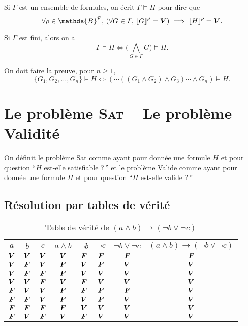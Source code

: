 \begin{defn}
	Si $\Gamma$\/ est un ensemble de formules, on écrit $\Gamma \models H$\/ pour dire que \[
		\forall \rho \in \mathds{B}^\mathcal{P},\,(\forall G \in \Gamma,\,\left\llbracket G \right\rrbracket^\rho = {\bfm V}\/) \implies \left\llbracket H \right\rrbracket^\rho = {\bfm V}\/
	.\]
\end{defn}

\begin{rmk}
	Si $\Gamma$\/ est fini, alors on a \[
		\Gamma \models H \iff \Big(\bigwedge_{G \in \Gamma} G\Big) \models H
	.\]

	On doit faire la preuve, pour $n \ge 1$, \[
		\{G_1, G_2, \ldots, G_n\} \models H \iff (\cdots((G_1 \land G_2) \land G_3) \cdots \land G_n) \models H
	.\]
\end{rmk}

\section{Le problème {\scshape Sat}\/ -- Le problème Validité}

On définit le problème {\sc Sat}\/ comme ayant pour donnée une formule $H$\/ et pour question ``$H$\/ est-elle satisfiable ?\,'' et le problème Valide comme ayant pour donnée une formule $H$\/ et pour question ``$H$\/ est-elle valide ?\,''

\subsection{Résolution par tables de vérité}

\begin{exm}
	\null

	\begin{table}[H]
		\centering
		\begin{tabular}{c|c|c|c|c|c|c|c}
			$a$\/ &$b$\/ &$c$\/ &$a\land b$\/ &$\lnot b$\/ &$\lnot c$\/ &$\lnot b \lor \lnot c$\/&$(a \land b) \to (\lnot b \lor \lnot c)$\\\hline
			$\bm{V}$&$\bm{V}$&$\bm{V}$&$\bm{V}$&$\bm{F}$&$\bm{F}$&$\bm{F}$&$\bm{F}$\\
			$\bm{V}$&$\bm{F}$&$\bm{V}$&$\bm{F}$&$\bm{V}$&$\bm{F}$&$\bm{V}$&$\bm{V}$\\
			$\bm{V}$&$\bm{F}$&$\bm{F}$&$\bm{F}$&$\bm{V}$&$\bm{V}$&$\bm{V}$&$\bm{V}$\\
			$\bm{V}$&$\bm{V}$&$\bm{F}$&$\bm{V}$&$\bm{F}$&$\bm{V}$&$\bm{V}$&$\bm{V}$\\
			$\bm{F}$&$\bm{V}$&$\bm{V}$&$\bm{F}$&$\bm{F}$&$\bm{F}$&$\bm{F}$&$\bm{V}$\\
			$\bm{F}$&$\bm{F}$&$\bm{V}$&$\bm{F}$&$\bm{V}$&$\bm{F}$&$\bm{V}$&$\bm{V}$\\
			$\bm{F}$&$\bm{F}$&$\bm{F}$&$\bm{F}$&$\bm{V}$&$\bm{V}$&$\bm{V}$&$\bm{V}$\\
			$\bm{F}$&$\bm{V}$&$\bm{F}$&$\bm{V}$&$\bm{F}$&$\bm{V}$&$\bm{V}$&$\bm{V}$\\
		\end{tabular}
		\caption{Table de vérité de $(a \land b) \to (\lnot b \lor \lnot c)$}
	\end{table}
\end{exm}

